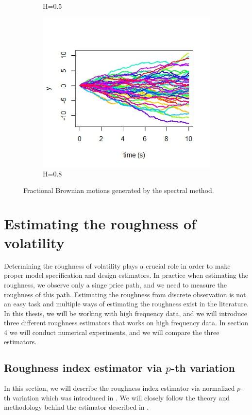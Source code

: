 \documentclass{article}
\begin{document}
\begin{figure}[h]
\begin{subfigure}{0.32\textwidth}
        \caption{H=0.5}
    \end{subfigure}\hfill
    \begin{subfigure}{0.32\textwidth}
        \centering
        \includegraphics[width=\textwidth]{specsim3.jpeg}
        \caption{H=0.8}
    \end{subfigure}
    \caption{Fractional Brownian motions generated by the spectral method.}
    \label{fig:fbmsim}
\end{figure}

\section{Estimating the roughness of volatility}
Determining the roughness of volatility plays a crucial role in order to make proper model specification and design estimators. In practice when estimating the roughness, we observe only a singe price path, and we need to measure the roughness of this path. Estimating the roughness from discrete observation is not an easy task and multiple ways of estimating the roughness exist in the literature. In this thesis, we will be working with high frequency data, and we will introduce three different roughness estimators that works on high frequency data. In section 4 we will conduct numerical experiments, and we will compare the three estimators. 
\subsection{Roughness index estimator via $p$-th variation}
In this section, we will describe the roughness index estimator via normalized $p$-th variation which was introduced in \cite{cont}. We will closely follow the theory and methodology behind the estimator described in \cite{cont}.\\
\end{document}
